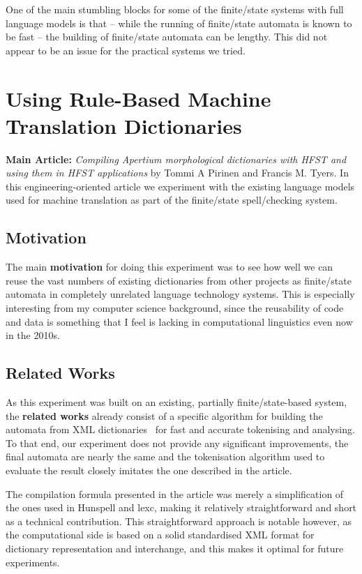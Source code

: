 \documentclass[officiallayout,final]{unihelcompling}
\begin{document}
One of the main stumbling blocks for some of the finite\-/state systems with
full language models is that -- while the running of finite\-/state automata is
known to be fast -- the building of finite\-/state automata can be lengthy. This
did not appear to be an issue for the practical systems we tried.


\section{Using Rule-Based Machine Translation Dictionaries}
\label{sec:apertium}

\textbf{Main Article:} \emph{Compiling Apertium morphological dictionaries with
HFST and using them in HFST applications} by Tommi A Pirinen and Francis M.
Tyers. In this engineering-oriented article we experiment with the existing
language models used for machine translation as part of the finite\-/state
spell\-/checking system.

\subsection{Motivation}

The main \textbf{motivation} for doing this experiment was to see how well we
can reuse the vast numbers of existing dictionaries from other projects as
finite\-/state automata in completely unrelated language technology systems.
This is especially interesting from my computer science background, since
the reusability of code and data is something that I feel is lacking in
computational linguistics even now in the 2010s.

\subsection{Related Works}

As this experiment was built on an existing, partially finite\-/state-based
system, the \textbf{related works} already consist of a specific algorithm for
building the automata from XML dictionaries~\citep{rojas2005construccion}
for fast and accurate tokenising and analysing. To that end, our
experiment does not provide any significant improvements, the final automata
are nearly the same and the tokenisation algorithm used to evaluate the result
closely imitates the one described in the article.

The compilation formula presented in the article was merely a simplification of
the ones used in Hunspell and lexc, making it relatively straightforward and
short as a technical contribution. This straightforward approach is notable
however, as the computational side is based on a solid standardised XML
format for dictionary representation and interchange, and this makes it optimal
for future experiments.
\end{document}
